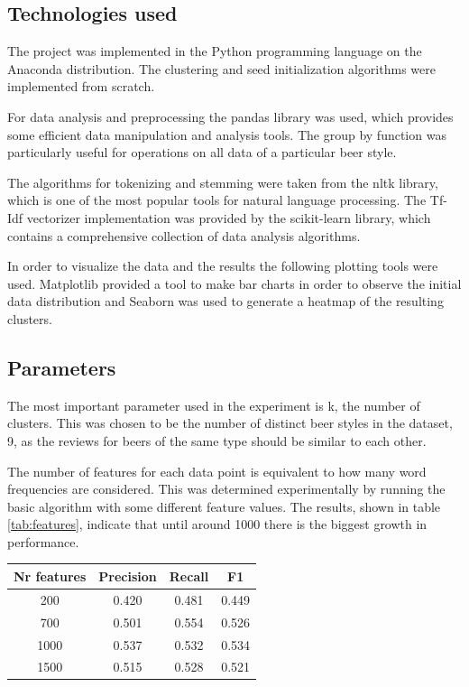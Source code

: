 \documentclass[12pt]{article}
\begin{document}
	\subsection{Technologies used}
	The project was implemented in the Python programming language on the Anaconda distribution. The clustering and seed initialization algorithms were implemented from scratch.
	
	For data analysis and preprocessing the pandas\cite{Pandas} library was used, which provides some efficient data manipulation and analysis tools. The group by function was particularly useful for operations on all data of a particular beer style. 
	
	The algorithms for tokenizing and stemming were taken from the nltk library\cite{NLTK}, which is one of the most popular tools for natural language processing. The Tf-Idf vectorizer implementation was provided by the scikit-learn library\cite{sk-learn}, which contains a comprehensive collection of data analysis algorithms.
	
	In order to visualize the data and the results the following plotting tools were used. Matplotlib\cite{Matplotlib} provided a tool to make bar charts in order to observe the initial data distribution and Seaborn\cite{Seaborn} was used to generate a heatmap of the resulting clusters.
		
	\subsection{Parameters}
	The most important parameter used in the experiment is k, the number of clusters. This was chosen to be the number of distinct beer styles in the dataset, 9, as the reviews for beers of the same type should be similar to each other.
	
	The number of features for each data point is equivalent to how many word frequencies are considered. This was determined experimentally by running the basic algorithm with some different feature values. The results, shown in table \ref{tab:features}, indicate that until around 1000 there is the biggest growth in performance.
	
	\begin{center}
		\label{tab:features}
		\begin{tabular}{ |c|c|c|c| } 
			\hline
			Nr features & Precision & Recall & F1 \\
			\hline
			200 & 0.420 & 0.481 & 0.449 \\
			700 & 0.501 & 0.554 & 0.526 \\
			1000 & 0.537 & 0.532 & 0.534 \\
			1500 & 0.515 & 0.528 & 0.521 \\
			\hline
		\end{tabular}
	\end{center}
\end{document}
